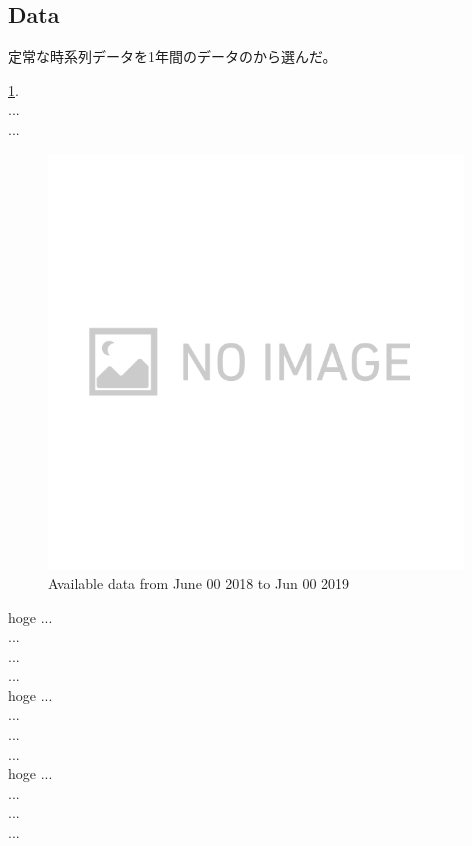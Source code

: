 \subsection{Data}
定常な時系列データを1年間のデータのから選んだ。


\ref{img:img317}.\\
...\\
...\\
\begin{figure}[H]
  \begin{center}   
    \includegraphics[width=11.0cm]{./img_chap3/img317.png}
    \caption{Available data from June 00 2018 to Jun 00 2019}\label{img:img317}
  \end{center}
\end{figure}

hoge
...\\
...\\
...\\
...\\

hoge
...\\
...\\
...\\
...\\

hoge
...\\
...\\
...\\
...\\

